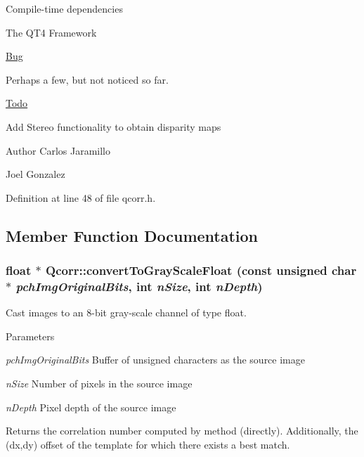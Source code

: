 \begin{DoxyParagraph}{Compile-\/time dependencies}

\end{DoxyParagraph}

\begin{DoxyItemize}
\item The QT4 Framework
\end{DoxyItemize}

\begin{Desc}
\item[\hyperlink{bug__bug000001}{Bug}]
\begin{DoxyItemize}
\item Perhaps a few, but not noticed so far.
\end{DoxyItemize}\end{Desc}
\begin{Desc}
\item[\hyperlink{todo__todo000001}{Todo}]
\begin{DoxyItemize}
\item Add Stereo functionality to obtain disparity maps
\end{DoxyItemize}\end{Desc}
\begin{DoxyAuthor}{Author}
Carlos Jaramillo 

Joel Gonzalez 
\end{DoxyAuthor}


Definition at line 48 of file qcorr.h.

\subsection{Member Function Documentation}
\hypertarget{classQcorr_ad1b26ace597c0c4a0f64a0bd9576d4fc}{
\subsubsection[{convertToGrayScaleFloat}]{\setlength{\rightskip}{0pt plus 5cm}float $\ast$ Qcorr::convertToGrayScaleFloat (const unsigned char $\ast$ {\em pchImgOriginalBits}, \/  int {\em nSize}, \/  int {\em nDepth})}}
\label{classQcorr_ad1b26ace597c0c4a0f64a0bd9576d4fc}


Cast images to an 8-\/bit gray-\/scale channel of type float. 
\begin{DoxyParams}{Parameters}
\item[{\em pchImgOriginalBits}]Buffer of unsigned characters as the source image \item[{\em nSize}]Number of pixels in the source image \item[{\em nDepth}]Pixel depth of the source image \end{DoxyParams}
\begin{DoxyReturn}{Returns}
the correlation number computed by method (directly). Additionally, the (dx,dy) offset of the template for which there exists a best match. 
\end{DoxyReturn}


